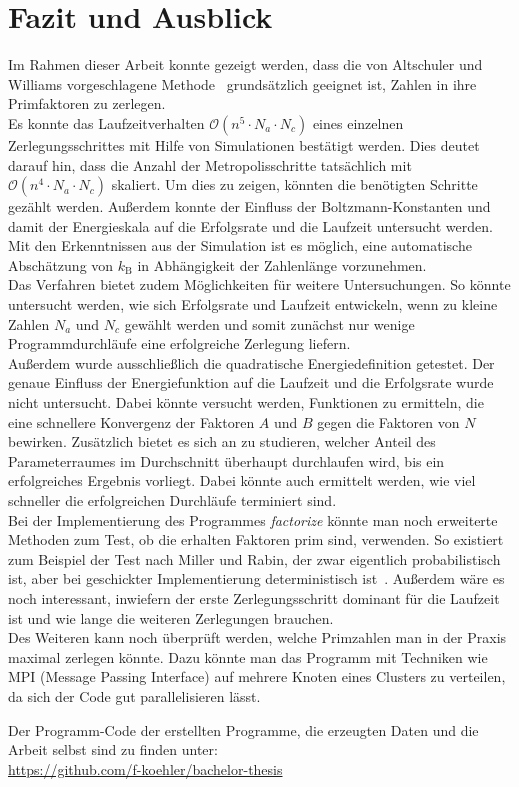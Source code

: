\chapter{Fazit und Ausblick}\label{ch:conclusion}
Im Rahmen dieser Arbeit konnte gezeigt werden, dass die von Altschuler und Williams vorgeschlagene Methode~\parencite{altschuler} grundsätzlich geeignet ist, Zahlen in ihre Primfaktoren zu zerlegen. \\
Es konnte das Laufzeitverhalten $\mathcal{O}\left(n^5\cdot N_a \cdot N_c\right)$ eines einzelnen Zerlegungsschrittes mit Hilfe von Simulationen bestätigt werden. Dies deutet darauf hin, dass die Anzahl der Metropolisschritte tatsächlich mit $\mathcal{O}\left(n^4\cdot N_a\cdot N_c\right)$ skaliert. Um dies zu zeigen, könnten die benötigten Schritte gezählt werden. Außerdem konnte der Einfluss der Boltzmann-Konstanten und damit der Energieskala auf die Erfolgsrate und die Laufzeit untersucht werden. Mit den Erkenntnissen aus der Simulation ist es möglich, eine automatische Abschätzung von $k_\mathrm{B}$ in Abhängigkeit der Zahlenlänge vorzunehmen. \\
Das Verfahren bietet zudem Möglichkeiten für weitere Untersuchungen. So könnte untersucht werden, wie sich Erfolgsrate und Laufzeit entwickeln, wenn zu kleine Zahlen $N_a$ und $N_c$ gewählt werden und somit zunächst nur wenige Programmdurchläufe eine erfolgreiche Zerlegung liefern. \\
Außerdem wurde ausschließlich die quadratische Energiedefinition getestet. Der genaue Einfluss der Energiefunktion auf die Laufzeit und die Erfolgsrate wurde nicht untersucht. Dabei könnte versucht werden, Funktionen zu ermitteln, die eine schnellere Konvergenz der Faktoren $A$ und $B$ gegen die Faktoren von $N$ bewirken. Zusätzlich bietet es sich an zu studieren, welcher Anteil des Parameterraumes im Durchschnitt überhaupt durchlaufen wird, bis ein erfolgreiches Ergebnis vorliegt. Dabei könnte auch ermittelt werden, wie viel schneller die erfolgreichen Durchläufe terminiert sind.\\
Bei der Implementierung des Programmes \textit{factorize} könnte man noch erweiterte Methoden zum Test, ob die erhalten Faktoren prim sind, verwenden. So existiert zum Beispiel der Test nach Miller und Rabin, der zwar eigentlich probabilistisch ist, aber bei geschickter Implementierung deterministisch ist~\parencite{miller}. Außerdem wäre es noch interessant, inwiefern der erste Zerlegungsschritt dominant für die Laufzeit ist und wie lange die weiteren Zerlegungen brauchen. \\
Des Weiteren kann noch überprüft werden, welche Primzahlen man in der Praxis maximal zerlegen könnte. Dazu könnte man das Programm mit Techniken wie MPI (Message Passing Interface) auf mehrere Knoten eines Clusters zu verteilen, da sich der Code gut parallelisieren lässt.

\vfill
Der Programm-Code der erstellten Programme, die erzeugten Daten und die Arbeit selbst sind zu finden unter:\\
\url{https://github.com/f-koehler/bachelor-thesis}
